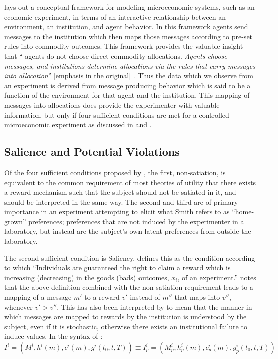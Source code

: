 \documentclass[../main.tex]{subfiles}
\begin{document}
\textcite{Smith1982} lays out a conceptual framework for modeling microeconomic systems, such as an economic experiment, in terms of an interactive relationship between an environment, an institution, and agent behavior.
In this framework agents send messages to the institution which then maps those messages according to pre-set rules into commodity outcomes.
This framework provides the valuable insight that \enquote{\textelp{} agents do not choose direct commodity allocations.
\textit{Agents choose messages, and institutions determine allocations via the rules that carry messages into allocation}} [emphasis in the original] \parencite[926]{Smith1982}.
Thus the data which we observe from an experiment is derived from message producing behavior which is said to be a function of the environment for that agent and the institution.
This mapping of messages into allocations does provide the experimenter with valuable information, but only if four sufficient conditions are met for a controlled microeconomic experiment as discussed in \textcite{Smith1982} and \textcite{Harrison1989}.

\subsection{Salience and Potential Violations}

Of the four sufficient conditions proposed by \textcite{Smith1982}, the first, non-satiation, is equivalent to the common requirement of most theories of utility that there exists a reward mechanism such that the subject should not be satiated in it, and should be interpreted in the same way.
The second and third are of primary importance in an experiment attempting to elicit what Smith refers to as \enquote{home-grown} preferences; preferences that are not induced by the experimenter in a laboratory, but instead are the subject's own latent preferences from outside the laboratory.


The second sufficient condition is Saliency.
\textcite[931]{Smith1982} defines this as the condition according to which \enquote{Individuals are guaranteed the right to claim a reward which is increasing (decreasing) in the goods (bads) outcomes, $x_i$, of an experiment.}
\textcite[223]{Harrison1994} notes that the above definition combined with the non-satiation requirement leads to a mapping of a message $m'$ to a reward $v'$ instead of $m''$ that maps into $v''$, whenever $v' > v''$.
This has also been interpreted by \textcite{Bruner2011} to mean that the manner in which messages are mapped to rewards by the institution is understood by the subject, even if it is stochastic, otherwise there exists an institutional failure to induce values.
In the syntax of \textcite{Smith1982}:
\begin{equation}
	\label{eq:S1982:I}
	I^i = \left(M^i,h^i(m),c^i(m),g^i(t_0,t,T) \right) \equiv I^i_p = \left(M^i_p, h^i_p(m) ,c^i_p(m), g^i_p(t_0,t,T) \right)
\end{equation}
\end{document}
